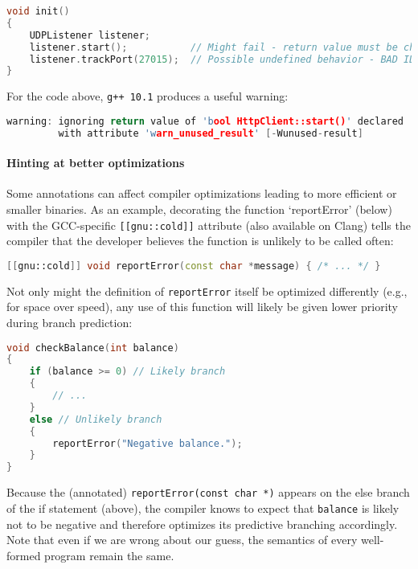 \documentclass[twoside,10pt,letterpaper,usenames]{newstyle-PearsonGeneric-7-38}
\begin{document}
\begin{lstlisting}[language=C++]
void init()
{
    UDPListener listener;
    listener.start();           // Might fail - return value must be checked!
    listener.trackPort(27015);  // Possible undefined behavior - BAD IDEA!
}
\end{lstlisting}
    

For the code above, \texttt{g++ 10.1} produces a useful warning:

\begin{lstlisting}[language=C++]
warning: ignoring return value of 'bool HttpClient::start()' declared
         with attribute 'warn_unused_result' [-Wunused-result]
\end{lstlisting}
    

\paragraph[Hinting at better optimizations]{Hinting at better optimizations}\label{hinting-at-better-optimizations}

Some annotations can affect compiler optimizations leading to more
efficient or smaller binaries. As an example, decorating the function
`reportError' (below) with the GCC-specific \texttt{[[gnu::cold]]}
attribute (also available on Clang) tells the compiler that the
developer believes the function is unlikely to be called often:

\begin{lstlisting}[language=C++]
[[gnu::cold]] void reportError(const char *message) { /* ... */ }
\end{lstlisting}
    

Not only might the definition of \texttt{reportError} itself be
optimized differently (e.g., for space over speed), any use of this
function will likely be given lower priority during branch prediction:

\begin{lstlisting}[language=C++]
void checkBalance(int balance)
{
    if (balance >= 0) // Likely branch
    {
        // ...
    }
    else // Unlikely branch
    {
        reportError("Negative balance.");
    }
}
\end{lstlisting}
    

Because the (annotated) \texttt{reportError(const char *)} appears on
the else branch of the if statement (above), the compiler knows to
expect that \texttt{balance} is likely {not} to be negative and
therefore optimizes its predictive branching accordingly. Note that even
if we are wrong about our guess, the semantics of every well-formed
program remain the same.
\end{document}
